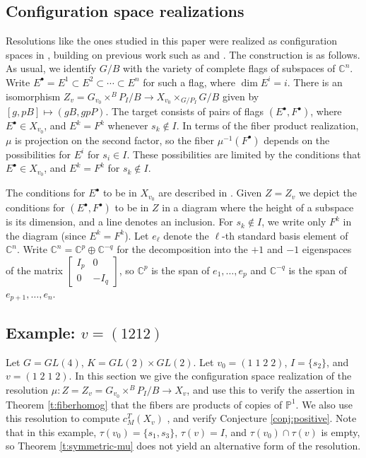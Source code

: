 \documentclass[11pt,letterpaper,reqno]{amsart}
\numberwithin{equation}{section}
\theoremstyle{plain}
\theoremstyle{definition}
\theoremstyle{remark}
\newcommand{\C}{\mathbb{C}}
\begin{document}
\subsection{Configuration space realizations} \label{ss:configuration}
Resolutions like the ones studied in this paper were realized as configuration spaces in 
\cite{Lar}, building on previous work such as \cite{GelfandMacPherson1982} and \cite[\S5.2]{EWY}.  The construction is as follows.
As usual, we identify $G/B$ with the variety of complete flags of subspaces of $\C^n$.
Write $E^\bullet = E^1 \subset E^2 \subset \cdots \subset E^n$ for such a flag, where
$\dim E^i = i$.  There is an isomorphism $Z_v = G_{v_0} \times^B P_I/B \to X_{v_0} \times_{G/P_I} G/B$ given by $[g,pB] \mapsto (gB, gpP)$.
The target consists of pairs of flags $(E^\bullet, F^\bullet)$, where $E^\bullet \in X_{v_0}$, and 
$E^k = F^k$ whenever $s_k \not\in I$.  In terms of the fiber product realization, $\mu$ is projection on
the second factor, so the fiber $\mu^{-1}(F^{\bullet})$ depends on the possibilities 
for $E^i$ for $s_i \in I$.  These possibilities are limited by the conditions that $E^\bullet \in X_{v_0}$,
and $E^k = F^k$ for $s_k \not\in I$.

The conditions for $E^\bullet$ to be in $X_{v_0}$ are described in \cite[Corollary 1.3]{Wys}.
Given $Z = Z_v$ we depict the conditions for $(E^\bullet, F^\bullet)$ to be in $Z$ in a diagram where
the height of a subspace is its dimension, and a line denotes an inclusion.  For $s_k \not\in I$, we 
write only $F^k$ in the diagram (since
$E^k = F^k$).
 Let $e_{\ell}$ denote the $\ell$-th standard
basis element of $\C^n$.  Write $\C^n = \C^p \oplus \C^{-q}$ for the decomposition into the $+1$ and $-1$
eigenspaces of the matrix $\begin{bmatrix} I_p & 0 \\ 0 & - I_q \end{bmatrix}$, so $\C^p$ is the span of $e_1, \ldots, e_p$
and $\C^{-q}$ is the span of $e_{p+1}, \ldots, e_n$.

\subsection{Example: $v=(1212)$} \label{ss:1212}
Let $G = GL(4)$, $K = GL(2) \times GL(2)$.  Let \(v_0=(1\;1\;2\;2)\), $I = \{ s_2 \}$, and \(v=(1\;2\;1\;2)\).  
In this section we give the configuration space realization of the resolution $\mu: Z = Z_v = G_{v_0} \times^B P_I/B\to X_v$,
and use this to verify the assertion in Theorem \ref{t:fiberhomog} that the fibers are
products of copies of $\mathbb P^1$.  We also use this resolution to compute \(c_M^T(X_v)\) ,
and verify Conjecture \ref{conj:positive}.  Note that in this example,
$\tau(v_0) = \{s_1, s_3 \}$,  $\tau(v) = I$, and $\tau(v_0) \cap \tau(v)$ is empty, so Theorem \ref{t:symmetric-mu} does not yield 
an alternative form of the resolution.
\end{document}
